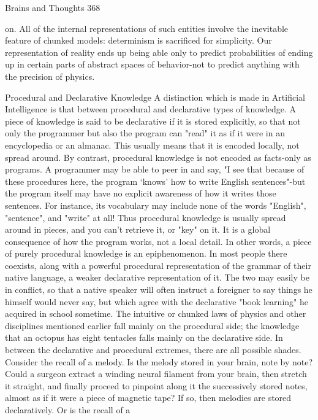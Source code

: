 Brains and Thoughts                                                                     368

on. All of the internal representations of such entities involve the inevitable feature of
chunked models: determinism is sacrificed for simplicity. Our representation of reality
ends up being able only to predict probabilities of ending up in certain parts of abstract
spaces of behavior-not to predict anything with the precision of physics.

                     Procedural and Declarative Knowledge
A distinction which is made in Artificial Intelligence is that between procedural and
declarative types of knowledge. A piece of knowledge is said to be declarative if it is
stored explicitly, so that not only the programmer but also the program can "read" it as if
it were in an encyclopedia or an almanac. This usually means that it is encoded locally,
not spread around. By contrast, procedural knowledge is not encoded as facts-only as
programs. A programmer may be able to peer in and say, "I see that because of these
procedures here, the program `knows' how to write English sentences"-but the program
itself may have no explicit awareness of how it writes those sentences. For instance, its
vocabulary may include none of the words "English", "sentence", and "write" at all! Thus
procedural knowledge is usually spread around in pieces, and you can't retrieve it, or
"key" on it. It is a global consequence of how the program works, not a local detail. In
other words, a piece of purely procedural knowledge is an epiphenomenon.
        In most people there coexists, along with a powerful procedural representation of
the grammar of their native language, a weaker declarative representation of it. The two
may easily be in conflict, so that a native speaker will often instruct a foreigner to say
things he himself would never say, but which agree with the declarative "book learning"
he acquired in school sometime. The intuitive or chunked laws of physics and other
disciplines mentioned earlier fall mainly on the procedural side; the knowledge that an
octopus has eight tentacles falls mainly on the declarative side.
        In between the declarative and procedural extremes, there are all possible shades.
Consider the recall of a melody. Is the melody stored in your brain, note by note? Could a
surgeon extract a winding neural filament from your brain, then stretch it straight, and
finally proceed to pinpoint along it the successively stored notes, almost as if it were a
piece of magnetic tape? If so, then melodies are stored declaratively. Or is the recall of a
